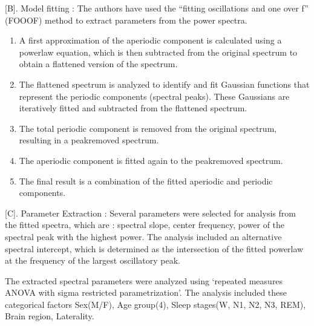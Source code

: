 \documentclass[letterpaper,10pt,english]{sphinxmanual}
\begin{document}
\sphinxAtStartPar
{[}B{]}. Model fitting : The authors have used the “fitting oscillations and one over f” (FOOOF) method to extract parameters from the power spectra.
\begin{enumerate}
%
\item {} 
\sphinxAtStartPar
A first approximation of the aperiodic component is calculated using a power\sphinxhyphen{}law equation, which is then subtracted from the original spectrum to obtain a flattened version of the spectrum.

\item {} 
\sphinxAtStartPar
The flattened spectrum is analyzed to identify and fit Gaussian functions that represent the periodic components (spectral peaks). These Gaussians are iteratively fitted and subtracted from the flattened spectrum.

\item {} 
\sphinxAtStartPar
The total periodic component is removed from the original spectrum, resulting in a peak\sphinxhyphen{}removed spectrum.

\item {} 
\sphinxAtStartPar
The aperiodic component is fitted again to the peak\sphinxhyphen{}removed spectrum.

\item {} 
\sphinxAtStartPar
The final result is a combination of the fitted aperiodic and periodic components.

\end{enumerate}


\sphinxAtStartPar
{}

\sphinxAtStartPar
{[}C{]}. Parameter Extraction : Several parameters were selected for analysis from the fitted spectra, which are : spectral slope, center frequency, power of the spectral peak with the highest power. The analysis included an alternative spectral intercept, which is determined as the intersection of the fitted power\sphinxhyphen{}law at the frequency of the largest oscillatory peak.

\sphinxAtStartPar
The extracted spectral parameters were analyzed using ‘repeated measures ANOVA
with sigma restricted parametrization’. The analysis included these categorical factors\sphinxhyphen{} Sex(M/F), Age group(4), Sleep stages(W, N1, N2, N3, REM), Brain region, Laterality.
\end{document}
